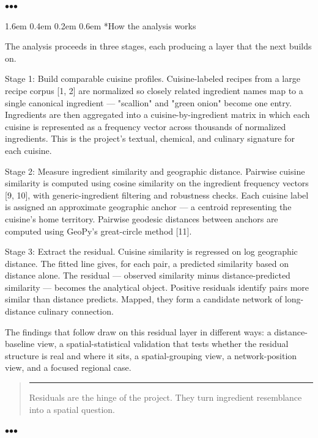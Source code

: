 \documentclass[11pt]{article}
\makeatletter
\renewcommand\section{\@startsection{section}{1}{\z@}%
  {1.6em \@plus 0.4em \@minus 0.2em}%
  {0.6em}%
  {\normalfont\Large\bfseries\color{black!85}}}
\newenvironment{pullquote}
  {\begin{quote}\itshape\color{black!72}\hspace*{-0.4em}\rule{2pt}{1em}\hspace{0.6em}}
  {\end{quote}}
\newcommand{\sectionbreak}{%
  \par\nobreak\vspace{0.8em}%
  \par\centerline{\textcolor{black!40}{$\bullet$\quad$\bullet$\quad$\bullet$}}%
  \par\vspace{0.6em}\nobreak%
}
\makeatother
\begin{document}
\sectionbreak


\section*{How the analysis works}


The analysis proceeds in three stages, each producing a layer that the next builds on.


Stage 1: Build comparable cuisine profiles. Cuisine-labeled recipes from a large recipe corpus [1, 2] are normalized so closely related ingredient names map to a single canonical ingredient — "scallion" and "green onion" become one entry. Ingredients are then aggregated into a cuisine-by-ingredient matrix in which each cuisine is represented as a frequency vector across thousands of normalized ingredients. This is the project's textual, chemical, and culinary signature for each cuisine.


Stage 2: Measure ingredient similarity and geographic distance. Pairwise cuisine similarity is computed using cosine similarity on the ingredient frequency vectors [9, 10], with generic-ingredient filtering and robustness checks. Each cuisine label is assigned an approximate geographic anchor — a centroid representing the cuisine's home territory. Pairwise geodesic distances between anchors are computed using GeoPy's great-circle method [11].


Stage 3: Extract the residual. Cuisine similarity is regressed on log geographic distance. The fitted line gives, for each pair, a predicted similarity based on distance alone. The residual — observed similarity minus distance-predicted similarity — becomes the analytical object. Positive residuals identify pairs more similar than distance predicts. Mapped, they form a candidate network of long-distance culinary connection.


The findings that follow draw on this residual layer in different ways: a distance-baseline view, a spatial-statistical validation that tests whether the residual structure is real and where it sits, a spatial-grouping view, a network-position view, and a focused regional case.


\begin{pullquote}
Residuals are the hinge of the project. They turn ingredient resemblance into a spatial question.
\end{pullquote}


\sectionbreak
\end{document}
